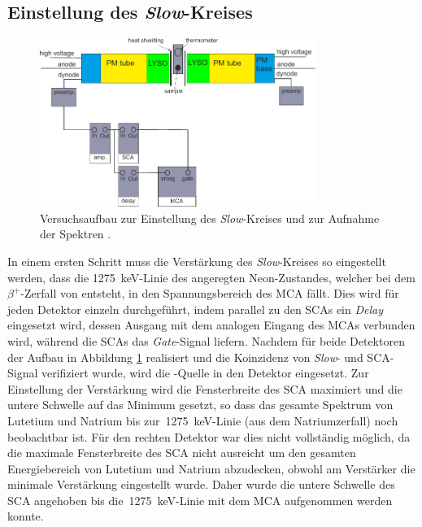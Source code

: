 \documentclass[11pt, a4paper]{article}
\numberwithin{equation}{section}
\begin{document}
\subsection{Einstellung des \textit{Slow}-Kreises}
\label{sec:slow_kreis}
\begin{figure}[h]
	\centering
	\includegraphics[width=0.8\textwidth]{./figures/aufbau/energie.pdf}
	\caption{Versuchsaufbau zur Einstellung des \textit{Slow}-Kreises und zur Aufnahme der Spektren \cite{anleitung}.}
	\label{fig:slow_kreis}
\end{figure}
In einem ersten Schritt muss die Verstärkung des \textit{Slow}-Kreises so eingestellt werden, dass die \SI{1275}{\keV}-Linie des angeregten Neon-Zustandes, welcher bei dem $\beta^+$-Zerfall von  entsteht, in den Spannungsbereich des MCA fällt.
Dies wird für jeden Detektor einzeln durchgeführt, indem parallel zu den SCAs ein \textit{Delay} eingesetzt wird, dessen Ausgang mit dem analogen Eingang des MCAs verbunden wird, während die SCAs das \textit{Gate}-Signal liefern.
Nachdem für beide Detektoren der Aufbau in Abbildung \ref{fig:slow_kreis} realisiert und die Koinzidenz von \textit{Slow}- und SCA-Signal verifiziert wurde, wird die -Quelle in den Detektor eingesetzt.
Zur Einstellung der Verstärkung wird die Fensterbreite des SCA maximiert und die untere Schwelle auf das Minimum gesetzt, so dass das gesamte Spektrum von Lutetium und Natrium bis zur~\SI{1275}{keV}-Linie (aus dem Natriumzerfall) noch beobachtbar ist.
Für den rechten Detektor war dies nicht vollständig möglich, da die maximale Fensterbreite des SCA nicht ausreicht um den gesamten Energiebereich von Lutetium und Natrium abzudecken, obwohl am Verstärker die minimale Verstärkung eingestellt wurde.
Daher wurde die untere Schwelle des SCA angehoben bis die~\SI{1275}{keV}-Linie mit dem MCA aufgenommen werden konnte.
\end{document}
